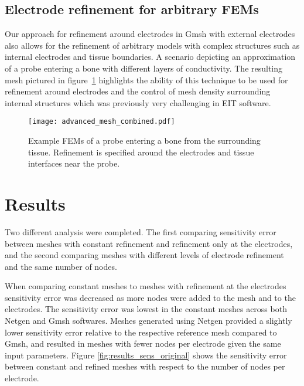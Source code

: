 \documentclass[12pt]{iopart}
\begin{document}

\subsection{Electrode refinement for arbitrary FEMs}
Our approach for refinement around electrodes in Gmsh with external electrodes 
also allows for the refinement of arbitrary models with complex structures
such as internal electrodes and tissue boundaries.
A scenario depicting an approximation of 
a probe entering a bone with different 
layers of conductivity. The resulting mesh pictured in 
figure~\ref{fig:adv_mesh}
highlights the ability of this technique
to be used for refinement around electrodes and the control of mesh density  
surrounding internal structures which was previously
very challenging in EIT software.
 
\begin{figure}
  \texttt{[image: advanced\_mesh\_combined.pdf]}
    \caption{\label{fig:adv_mesh} Example FEMs of a probe entering a bone from the surrounding 
    tissue. Refinement is specified around the electrodes and tissue interfaces near the probe.}
\end{figure}
 

\section{Results}

Two different analysis were completed. The first comparing sensitivity error between
meshes with constant refinement and refinement only at the electrodes, and the second 
comparing meshes with different levels of electrode refinement and the same number of nodes.

When comparing constant meshes to meshes with refinement at the electrodes sensitivity error
was decreased as more nodes were added to the mesh and to the electrodes. The sensitivity
error was lowest in the constant meshes across both Netgen and Gmsh softwares. Meshes 
generated using Netgen
provided a slightly lower sensitivity error relative to the respective reference mesh
compared to Gmsh, and resulted in meshes with fewer nodes per electrode given the same input
parameters. Figure \ref{fig:results_sens_original} shows the sensitivity error between
constant and refined meshes with respect to the number of nodes per electrode.  
\end{document}

